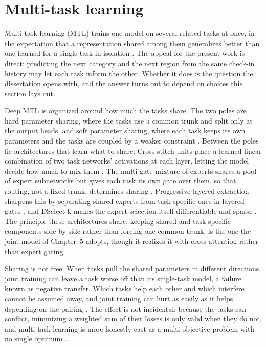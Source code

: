 
\section{Multi-task learning}
\label{sec:fund:mtl}

Multi-task learning (MTL) trains one model on several related tasks at once, in the
expectation that a representation shared among them generalizes better than one
learned for a single task in isolation \cite{caruana1997multitask}. The appeal for
the present work is direct: predicting the next category and the next region from the
same check-in history may let each task inform the other. Whether it does is the
question the dissertation opens with, and the answer turns out to depend on choices
this section lays out.

Deep MTL is organized around how much the tasks share. The two poles are hard
parameter sharing, where the tasks use a common trunk and split only at the output
heads, and soft parameter sharing, where each task keeps its own parameters and the
tasks are coupled by a weaker constraint \cite{ruder2017mtloverview}. Between the
poles lie architectures that learn what to share. Cross-stitch units place a learned
linear combination of two task networks' activations at each layer, letting the model
decide how much to mix them \cite{misra2016cross}. The multi-gate mixture-of-experts
shares a pool of expert subnetworks but gives each task its own gate over them, so
that routing, not a fixed trunk, determines sharing \cite{ma2018mmoe}. Progressive
layered extraction sharpens this by separating shared experts from task-specific ones
in layered gates \cite{tang2020ple}, and DSelect-k makes the expert selection itself
differentiable and sparse \cite{hazimeh2021dselectk}. The principle these architectures
share, keeping shared and task-specific components side by side rather than forcing one
common trunk, is the one the joint model of Chapter~5 adopts, though it realizes it with
cross-attention rather than expert gating.

Sharing is not free. When tasks pull the shared parameters in different directions,
joint training can leave a task worse off than its single-task model, a failure
known as negative transfer. Which tasks help each other and which interfere cannot be
assumed away, and joint training can hurt as easily as it helps depending on the
pairing \cite{standley2020tasks}. The effect is not incidental: because the tasks can
conflict, minimizing a weighted sum of their losses is only valid when they do not,
and multi-task learning is more honestly cast as a multi-objective problem with no
single optimum \cite{sener2018mgda}.

